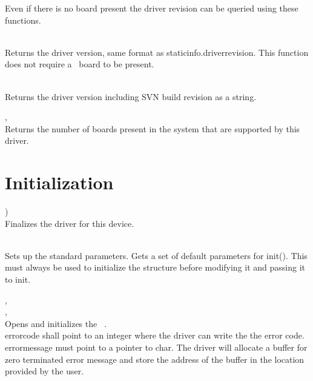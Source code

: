 	Even if there is no board present the driver revision can be queried using these functions.

	\\
	Returns the driver version, same format as \textsf{\prefix static\tu info.driver\tu revision}. 
	This function does not require a \deviceName\ board to be present.

	\\
	Returns the driver version including SVN build revision as a string. 

	, \\
	\label{countdevices}
	Returns the number of boards present in the system that are supported by this driver.\par


\section {Initialization}

		\device )\\
		Finalizes the driver for this device.

		\\
		Sets up the standard parameters. Gets a set of default parameters for \textsf{\prefix init()}. 
		This must always be used to initialize the \textsf{\initparameters} structure before modifying it 
		and passing it to \textsf{\prefix init}.\par

		, \\ 
		, \\
		Opens and initializes the \deviceName\ 
		. \\
		\textsf{error\tu code} shall point to an integer where the driver can write the the error code. \\
		\textsf{error\tu message} must point to a pointer to char. 
		The driver will allocate a buffer for zero terminated error message and store the address of the buffer in the location provided by the user.\par

